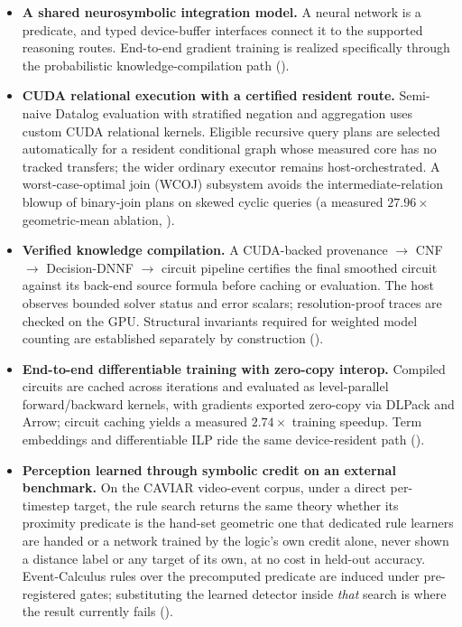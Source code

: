 \begin{itemize}
  \item \textbf{A shared neurosymbolic integration model.} A neural network is a predicate, and typed device-buffer interfaces connect it to the supported reasoning routes. End-to-end gradient training is realized specifically through the probabilistic knowledge-compilation path ().
  \item \textbf{CUDA relational execution with a certified resident route.} Semi-naive Datalog evaluation with stratified negation and aggregation uses custom CUDA relational kernels. Eligible recursive query plans are selected automatically for a resident conditional graph whose measured core has no tracked transfers; the wider ordinary executor remains host-orchestrated. A worst-case-optimal join (WCOJ) subsystem avoids the intermediate-relation blowup of binary-join plans on skewed cyclic queries (a measured $27.96\times$ geometric-mean ablation, ).
  \item \textbf{Verified knowledge compilation.} A CUDA-backed provenance $\to$ CNF $\to$ Decision-DNNF $\to$ circuit pipeline certifies the final smoothed circuit against its back-end source formula before caching or evaluation. The host observes bounded solver status and error scalars; resolution-proof traces are checked on the GPU. Structural invariants required for weighted model counting are established separately by construction ().
  \item \textbf{End-to-end differentiable training with zero-copy interop.} Compiled circuits are cached across iterations and evaluated as level-parallel forward/backward kernels, with gradients exported zero-copy via DLPack and Arrow; circuit caching yields a measured $2.74\times$ training speedup. Term embeddings and differentiable ILP ride the same device-resident path ().
  \item \textbf{Perception learned through symbolic credit on an external benchmark.} On the CAVIAR video-event corpus, under a direct per-timestep target, the rule search returns the same theory whether its proximity predicate is the hand-set geometric one that dedicated rule learners are handed or a network trained by the logic's own credit alone, never shown a distance label or any target of its own, at no cost in held-out accuracy. Event-Calculus rules over the precomputed predicate are induced under pre-registered gates; substituting the learned detector inside \emph{that} search is where the result currently fails ().

\end{itemize}
